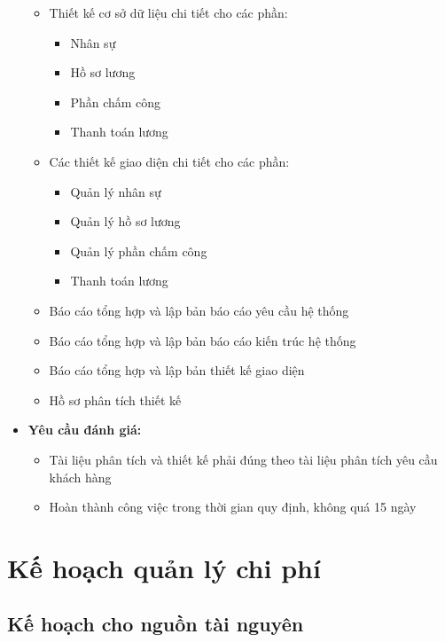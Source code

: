 \begin{itemize}
\begin{itemize}
              \item Thiết kế cơ sở dữ liệu chi tiết cho các phần:
                    \begin{itemize}
                        \item Nhân sự
                        \item Hồ sơ lương
                        \item Phần chấm công
                        \item Thanh toán lương
                    \end{itemize}
              \item Các thiết kế giao diện chi tiết cho các phần:
                    \begin{itemize}
                        \item Quản lý nhân sự
                        \item Quản lý hồ sơ lương
                        \item Quản lý phần chấm công
                        \item Thanh toán lương
                    \end{itemize}
              \item Báo cáo tổng hợp và lập bản báo cáo yêu cầu hệ thống
              \item Báo cáo tổng hợp và lập bản báo cáo kiến trúc hệ thống
              \item Báo cáo tổng hợp và lập bản thiết kế giao diện
              \item Hồ sơ phân tích thiết kế
          \end{itemize}
    \item \textbf{Yêu cầu đánh giá:}
          \begin{itemize}
              \item Tài liệu phân tích và thiết kế phải đúng theo tài liệu phân tích yêu cầu khách hàng
              \item Hoàn thành công việc trong thời gian quy định, không quá 15 ngày
          \end{itemize}
\end{itemize}
\section{Kế hoạch quản lý chi phí}
\subsection{Kế hoạch cho nguồn tài nguyên}
